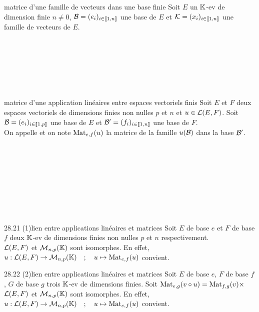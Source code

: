 

\begin{adjustwidth}{-3cm}{-3cm}



\begin{definition}{28.1}{matrice d'une famille de vecteurs dans une base finie}
    Soit $E$ un $\mathbb{K}$-ev de dimension finie $n \neq 0$, $\mathcal{B} = (e_i)_{i\in \llbracket 1,n \rrbracket}$ une base de $E$ et $\mathcal{K} = (x_i)_{i\in \llbracket 1,n \rrbracket}$ une famille de vecteurs de $E$. \\\\\\\\\\\\\\ 
\end{definition}

\begin{definition}{28.10}{matrice d'une application linéaires entre espaces vectoriels finis}
Soit $E$ et $F$ deux espaces vectoriels de dimensions finies non nulles $p$ et $n$ et $u \in \mathcal{L}(E,F)$. Soit $\mathcal{B} = (e_i)_{i\in \llbracket 1,p \rrbracket}$ une base de $E$ et $\mathcal{B'} = (f_i)_{i\in \llbracket 1,n \rrbracket}$ une base de $F$.\\
On appelle  et on note $\text{Mat}_{e,f}(u)$ la matrice de la famille $u(\mathcal{B})$ dans la base $\mathcal{B}'$. \\\\\\\\\\\\\\\\\\
\end{definition}

\begin{theoreme}{28.21 (1)}{lien entre applications linéaires et matrices}
    Soit $E$ de base $e$ et $F$ de base $f$ deux $\mathbb{K}$-ev de dimensions finies non nulles $p$ et $n$ respectivement.\\
    $\mathcal{L}(E,F)$ et $\mathcal{M}_{n,p}(\mathbb{K})$ sont isomorphes. En effet, $u : \mathcal{L}(E,F) \to \mathcal{M}_{n,p}(\mathbb{K})\quad; \quad u\mapsto \text{Mat}_{e,f}(u)$ convient.
\end{theoreme}

\begin{theoreme}{28.22 (2)}{lien entre applications linéaires et matrices}
    Soit $E$ de base $e$, $F$ de base $f$, $G$ de base $g$ trois $\mathbb{K}$-ev de dimensions finies. Soit $\text{Mat}_{e,g}(v \circ u) = \text{Mat}_{f,g}(v) \times $ \\
    $\mathcal{L}(E,F)$ et $\mathcal{M}_{n,p}(\mathbb{K})$ sont isomorphes. En effet, $u : \mathcal{L}(E,F) \to \mathcal{M}_{n,p}(\mathbb{K})\quad; \quad u\mapsto \text{Mat}_{e,f}(u)$ convient.
\end{theoreme}


\end{adjustwidth}
